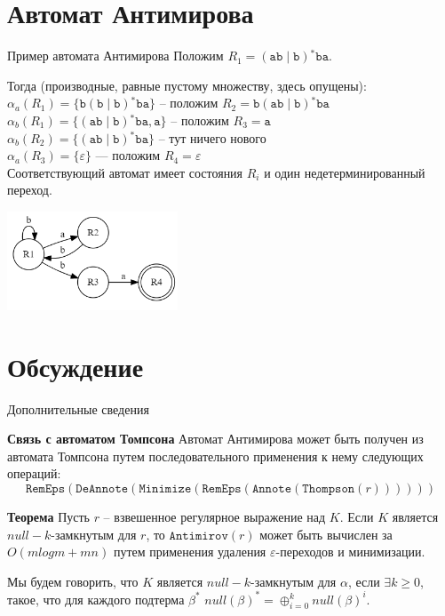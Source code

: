 \documentclass[mathserif]{beamer}
\def\Thompson{\mathtt{Thompson}}
\def\Antimirov{\mathtt{Antimirov}}
\def\RemEps{\mathtt{RemEps}}
\def\DeAnnote{\mathtt{DeAnnote}}
\def\Annote{\mathtt{Annote}}
\def\Minimize{\mathtt{Minimize}}
\def\alter{\ensuremath{\mathrel{\vert}}}%
\def\star{\ensuremath{^{*}}}%
\def\regexpstr#1{\mathtt{#1}}%
\newcommand{\empt}{\varepsilon} %
\begin{document}
\section{Автомат Антимирова}
\begin{frame}{Пример автомата Антимирова}
    \vspace{-5pt}
    Положим $R_{1} = (\regexpstr{ab} \alter \regexpstr{b})\star \regexpstr{ba}$. %

    Тогда (производные, равные пустому множеству, здесь опущены):\\
    $\alpha_{a}(R_{1}) = \{\regexpstr{b}(\regexpstr{b}\alter \regexpstr{b})\star\regexpstr{ba}\}$ -- положим $R_{2} = \regexpstr{b}(\regexpstr{ab}\alter \regexpstr{b})\star\regexpstr{ba}$\\  %
    $\alpha_{b}(R_{1}) = \{(\regexpstr{ab}\alter \regexpstr{b})\star\regexpstr{ba}, \regexpstr{a}\}$ -- положим $R_{3} = \regexpstr{a}$\\  %
    $\alpha_{b}(R_{2}) = \{(\regexpstr{ab}\alter \regexpstr{b})\star \regexpstr{ba}\}$ -- тут ничего нового\\  %
    $\alpha_{a}(R_{3}) = \{\empt\}$ — положим $R_{4} = \empt$\\  %
    Соответствующий автомат имеет состояния $R_{i}$ и один недетерминированный переход.

    \includegraphics[width=2in, keepaspectratio]{antimirov1.png} %
\end{frame}

\section{Обсуждение}
\begin{frame}{Дополнительные сведения}
    \begin{block}{\bf Связь с автоматом Томпсона}
        Автомат Антимирова может быть получен из автомата Томпсона путем последовательного применения к нему следующих операций:
        \[\RemEps(\DeAnnote(\Minimize(\RemEps(\Annote(\Thompson(r))))))\] %
    \end{block}
    \begin{block}{\bf Теорема}
        Пусть $r$ -- взвешенное регулярное выражение над $K$. Если $K$ является $null-k$-замкнутым для $r$, то $\Antimirov(r)$ может быть вычислен за $O(m log m + mn)$ путем применения удаления $\empt$-переходов и минимизации.
    \end{block}
    Мы будем говорить, что $K$ является $null-k$-замкнутым для $\alpha$, если $\exists k \geq 0$, такое, что для каждого подтерма $\beta^*$ $null(\beta)^* = \oplus_{i=0}^{k} null(\beta)^i$.
\end{frame}
\end{document}

